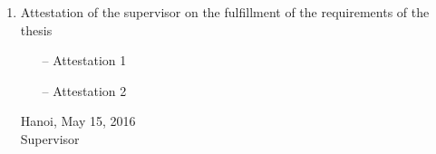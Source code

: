 \begin{requirement}
\begin{enumerate}[leftmargin=*]
	\item Attestation of the supervisor on the fulfillment of the requirements of the thesis
		\begin{itemize}
			\item[--] Attestation 1
			\item[--] Attestation 2
		\end{itemize}
		\begin{flushright}
			\begin{minipage}{0.5\linewidth}
				\centering
				Hanoi, May 15, 2016\\
				Supervisor\\
				\vspace{30pt}
				\supervisor
			\end{minipage}	
		\end{flushright}
\end{enumerate}
\end{requirement}